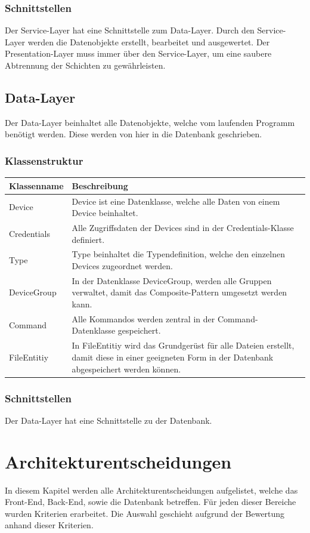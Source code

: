 \subsubsection{Schnittstellen}
Der Service-Layer hat eine Schnittstelle zum Data-Layer. Durch den Service-Layer werden die Datenobjekte erstellt, bearbeitet und ausgewertet. Der Presentation-Layer muss immer über den Service-Layer, um eine saubere Abtrennung der Schichten zu gewährleisten.

\subsection{Data-Layer}
Der Data-Layer beinhaltet alle Datenobjekte, welche vom laufenden Programm benötigt werden. Diese werden von hier in die Datenbank geschrieben.
\subsubsection{Klassenstruktur}
\begin{table}[H]
\centering
    \begin{tabular}{@{}l p{14.1cm} @{}}\toprule    
    {Klassenname} & {Beschreibung}\\ \midrule
    Device & Device ist eine Datenklasse, welche alle Daten von einem Device beinhaltet.\\
    Credentials & Alle Zugriffsdaten der Devices sind in der Credentials-Klasse definiert. \\
    Type & Type beinhaltet die Typendefinition, welche den einzelnen Devices zugeordnet werden. \\
    DeviceGroup & In der Datenklasse DeviceGroup, werden alle Gruppen verwaltet, damit das Composite-Pattern umgesetzt werden kann.\\
    Command & Alle Kommandos werden zentral in der Command-Datenklasse gespeichert.\\
    FileEntitiy & In FileEntitiy wird das Grundgerüst für alle Dateien erstellt, damit diese in einer geeigneten Form in der Datenbank abgespeichert werden können.\\ 
    \bottomrule
    \end{tabular}
\end{table}
\subsubsection{Schnittstellen}
Der Data-Layer hat eine Schnittstelle zu der Datenbank.

\section{Architekturentscheidungen}
In diesem Kapitel werden alle Architekturentscheidungen aufgelistet, welche das Front-End, Back-End, sowie die Datenbank betreffen. Für jeden dieser Bereiche wurden Kriterien erarbeitet. Die Auswahl geschieht aufgrund der Bewertung anhand dieser Kriterien.

